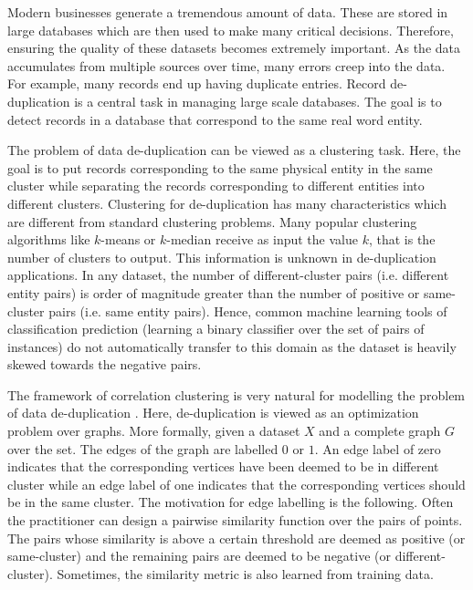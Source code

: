 \documentclass[12pt]{article}
\begin{document}
\fi

Modern businesses generate a tremendous amount of data. These are stored in large databases which are then used to make many critical decisions. Therefore, ensuring the quality of these datasets becomes extremely important. As the data accumulates from multiple sources over time, many errors creep into the data. For example, many records end up having duplicate entries. Record de-duplication is a central task in managing large scale databases. The goal is to detect records in a database that correspond to the same real word entity. 

The problem of data de-duplication can be viewed as a clustering task. Here, the goal is to put records corresponding to the same physical entity in the same cluster while separating the records corresponding to different entities into different clusters. Clustering for de-duplication has many characteristics which are different from standard clustering problems. Many popular clustering algorithms like $k$-means or $k$-median receive as input the value $k$, that is the number of clusters to output. This information is unknown in de-duplication applications. In any dataset, the number of different-cluster pairs (i.e. different entity pairs) is order of magnitude greater than the number of positive or same-cluster pairs (i.e. same entity pairs). Hence, common machine learning tools of classification prediction (learning a binary classifier over the set of pairs of instances) do not automatically transfer to this domain as the dataset is heavily skewed towards the negative pairs. 

The framework of correlation clustering is very natural for modelling the problem of data de-duplication \cite{bansal2004correlation}. Here, de-duplication is viewed as an optimization problem over graphs. More formally, given a dataset $X$ and a complete graph $G$ over the set. The edges of the graph are labelled $0$ or $1$. An edge label of zero indicates that the corresponding vertices have been deemed to be in different cluster while an edge label of one indicates that the corresponding vertices should be in the same cluster. The motivation for edge labelling is the following. Often the practitioner can design a pairwise similarity function over the pairs of points. The pairs whose similarity is above a certain threshold are deemed as positive (or same-cluster) and the remaining pairs are deemed to be negative (or different-cluster). Sometimes, the similarity metric is also learned from training data. 
\end{document}
